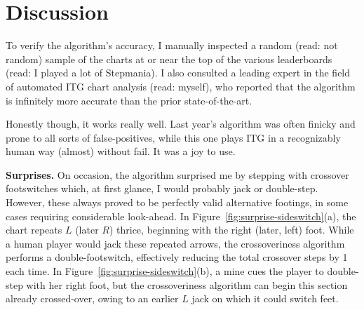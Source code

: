\documentclass[10pt]{sigplanconf}
\begin{document}

\section{Discussion}

To verify the algorithm's accuracy,
I manually inspected a random (read: not random) sample of the charts at or near the top of the various leaderboards
(read: I played a lot of Stepmania).
I also consulted a leading expert in the field of automated ITG chart analysis (read: myself),
who reported that the algorithm is infinitely more accurate than the prior state-of-the-art.

Honestly though, it works really well.
Last year's algorithm was often finicky and prone to all sorts of false-positives,
while this one plays ITG in a recognizably human way (almost) without fail.
It was a joy to use.

{\bf Surprises.}
On occasion, the algorithm surprised me by stepping with crossover footswitches which,
at first glance, I would probably jack or double-step.
However, these always proved to be perfectly valid alternative footings,
in some cases requiring considerable look-ahead.
In Figure~\ref{fig:surprise-sideswitch}(a),
the chart repeats $L$ (later $R$) thrice,
beginning with the right (later, left) foot.
While a human player would jack these repeated arrows,
the crossoveriness algorithm performs a double-footswitch,
effectively reducing the total crossover steps by 1 each time.
In Figure~\ref{fig:surprise-sideswitch}(b),
a mine cues the player to double-step with her right foot,
but the crossoveriness algorithm can begin this section already crossed-over,
owing to an earlier $L$ jack on which it could switch feet.
\end{document}
